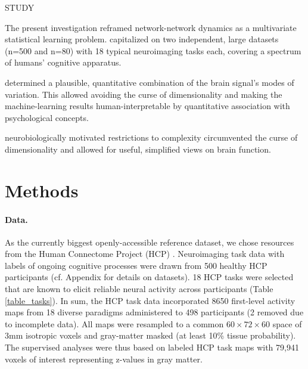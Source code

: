 \documentclass{article} %
\begin{document}
STUDY

The present investigation reframed network-network dynamics as a
multivariate statistical learning problem.
capitalized on two independent, large datasets (n=500 and n=80) with
18 typical neuroimaging tasks each, covering a spectrum of humans'
cognitive apparatus. 

determined a plausible, quantitative
combination of the brain signal's modes of variation. This allowed
avoiding the curse of dimensionality and making the machine-learning
results human-interpretable by quantitative association with
psychological concepts.

neurobiologically motivated restrictions to complexity circumvented the curse of dimensionality and allowed for useful, simplified views on brain function.



\section{Methods}
%
\paragraph{Data.}
As the currently biggest openly-accessible reference dataset,
we chose resources from the Human Connectome Project (HCP)
\cite{barch2013}.
Neuroimaging task data with labels of ongoing cognitive processes
were drawn from 500
healthy HCP participants (cf. Appendix for details on datasets).
18 HCP tasks 
were selected that are known to elicit reliable neural activity
across participants (Table \ref{table_tasks}).
In sum, the HCP task data incorporated 8650 first-level activity maps
from 18 diverse paradigms administered to 498 participants (2 removed
due to incomplete data).
All maps were resampled to a common $60\times72\times60$ space of
3mm isotropic voxels and gray-matter masked (at least 10\% tissue
probability).
The supervised analyses were thus based on labeled HCP task maps with
79,941 voxels of interest representing z-values in gray matter.
\end{document}
